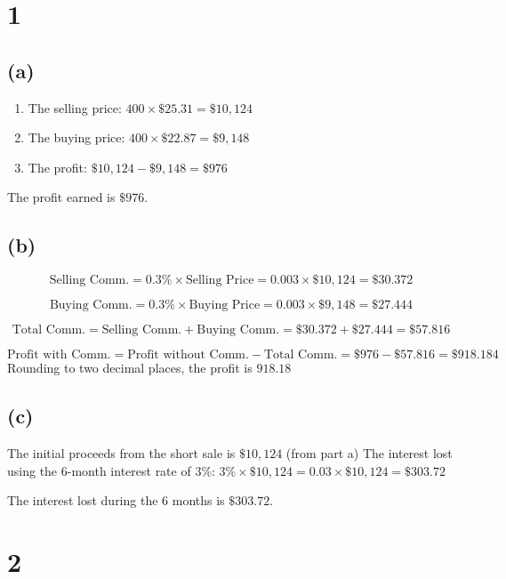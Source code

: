     \section{1}\label{section}

    \subsection{(a)}\label{a}

\begin{enumerate}
\def\labelenumi{\arabic{enumi}.}
\tightlist
\item
  The selling price: \(400 \times \$25.31 = \$10,124\)
\item
  The buying price: \(400 \times \$22.87 = \$9,148\)
\item
  The profit: \(\$10,124 - \$9,148 = \$976\)
\end{enumerate}

The profit earned is \(\boxed{\$976}\).

    \subsection{(b)}\label{b}

\[\text{Selling Comm.} = 0.3\% \times \text{Selling Price} = 0.003 \times \$10,124 = \$30.372\]

\[\text{Buying Comm.} = 0.3\% \times \text{Buying Price} = 0.003 \times \$9,148 = \$27.444\]

\[\text{Total Comm.} = \text{Selling Comm.} + \text{Buying Comm.} = \$30.372 + \$27.444 = \$57.816\]

\[\text{Profit with Comm.} = \text{Profit without Comm.} - \text{Total Comm.} = \$976 - \$57.816 = \$918.184\]
Rounding to two decimal places, the profit is \(\boxed{918.18}\)

    \subsection{(c)}\label{c}

The initial proceeds from the short sale is \(\$10,124\) (from part a)
The interest lost using the 6-month interest rate of 3\%:
\(3\% \times \$10,124 = 0.03 \times \$10,124 = \$303.72\)

The interest lost during the 6 months is \(\boxed{\$303.72}\).

    \section{2}\label{section}

